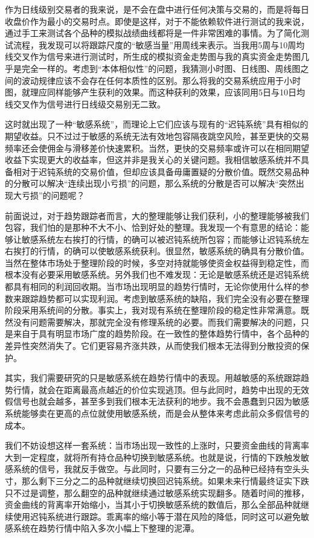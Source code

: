 作为日线级别交易者的我来说，是不会在盘中进行任何决策与交易的，而是将每日收盘价作为最小的交易时点。即使是这样，对于不能依赖软件进行测试的我来说，通过手工来测试各个品种的模拟战绩曲线都将是一件非常困难的事情。为了简化测试流程，我发现可以将跟踪尺度的“敏感当量”用周线来表示。当我用5周与10周均线交叉作为信号来进行测试时，所生成的模拟资金走势图与我的真实资金走势图几乎是完全一样的。考虑到“本体相似性”的问题，我猜测小时图、日线图、周线图之间的波动规律应该不会存在任何本质性的区别。那么将我的交易系统应用于小时图，就理应同样能够产生获利的效果。而这种获利的效果，应该同用5日与10日均线交叉作为信号进行日线级交易别无二致。

这时就出现了一种“敏感系统”，而理论上它们应该与现有的“迟钝系统”具有相似的期望收益。只不过过于敏感的系统无法有效地包容隔夜跳空风险，甚至更快的交易频率还会使佣金与滑移差价快速累积。当然，更快的交易频率或许可以在相同期望收益下实现更大的收益率，但这并非是我关心的关键问题。我相信敏感系统并不具备相对于迟钝系统的交易价值，但却应该具备毋庸置疑的分散价值。既然交易品种的分散可以解决“连续出现小亏损”的问题，那么系统的分散是否可以解决“突然出现大亏损”的问题呢？

前面说过，对于趋势跟踪者而言，大的整理能够让我们获利，小的整理能够被我们包容，我们怕的是那种不大不小、恰到好处的整理。我发现一个有意思的结论：能够让敏感系统左右挨打的行情，的确可以被迟钝系统所包容；而能够让迟钝系统左右挨打的行情，的确可以使敏感系统获利。很显然，敏感系统的确具有分散价值。当然在整体市场处于整理阶段的时候，多空对持就能够使资金权益得到稳定性，而根本没有必要采用敏感系统。另外我们也不难发现：无论是敏感系统还是迟钝系统都具有相同的利润回收期。当市场出现明显的趋势行情时，无论你使用什么样的参数来跟踪趋势都可以实现利润。考虑到敏感系统的缺陷，我们完全没有必要在整理阶段采用系统间的分散。事实上，我对现有系统在整理阶段的稳定性非常满意。既然没有问题需要解决，那就完全没有修理系统的必要。而我们需要解决的问题，只是来自于具有明显市场广度的趋势阶段。在一致性的整体趋势行情中，各个品种的差异性突然消失了。它们更容易齐涨共跌，从而使我们根本无法得到分散投资的保护。

其实，我们需要研究的只是敏感系统在趋势行情中的表现。用越敏感的系统跟踪趋势行情，就会在距离最高点越近的价位实现逃顶。但与此同时，趋势中出现的无效假信号也就会越多，甚至多到我们根本无法获利的地步。我不会愚蠢到只因为敏感系统能够卖在更高的点位就使用敏感系统，而是会从整体来考虑此前众多假信号的成本。

我们不妨设想这样一套系统：当市场出现一致性的上涨时，只要资金曲线的背离率大到一定程度，就将所有持仓品种切换到敏感系统。也就是说，行情的下跌触发敏感系统的信号，我就反手做空。与此同时，只要有三分之一的品种已经持有空头头寸，那么剩下三分之二的品种就继续切换回迟钝系统。如果未来行情最终证实下跌只不过是调整，那么翻空的品种就继续通过敏感系统实现翻多。随着时间的推移，资金曲线的背离率开始缩小，当其小于切换敏感系统的数值后，那么全部品种就继续使用迟钝系统进行跟踪。乖离率的缩小等于潜在风险的降低，同时这可以避免敏感系统在趋势行情中陷入多次小幅上下整理的泥潭。

